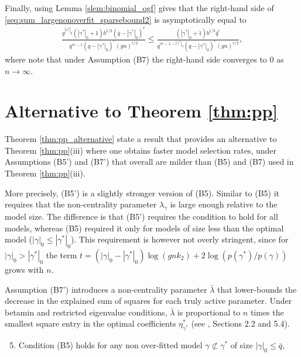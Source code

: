 Finally, using Lemma \ref{slem:binomial_ogf} gives that the right-hand side of \eqref{seq:sum_largenonoverfit_sparsebound2} is asymptotically equal to
\begin{align}
\frac{q^{|\gamma^*|_0} (|\gamma^*|_0+1) b^{1/2} (\bar{q}-|\gamma^*|_0)^r}{q^{cr-1} (q - |\gamma^*|_0)^r (g n)^{r/2}}
\leq 
\frac{(|\gamma^*|_0+1) b^{1/2} \bar{q}^r}{q^{cr-1-|\gamma^*|_0} (q - |\gamma^*|_0)^r (g n)^{r/2}},
\nonumber
\end{align}
where note that under Assumption (B7) the right-hand side converges to 0 as $n \rightarrow \infty$.






\section{Alternative to Theorem \ref{thm:pp}}
\label{ssec:alt_thm_pp}


Theorem \ref{thm:pp_alternative} state a result that provides an alternative to Theorem \ref{thm:pp}(iii) where one obtains faster model selection rates, under Assumptions (B5') and (B7') that overall are milder than (B5) and (B7) used in Theorem \ref{thm:pp}(iii).

More precisely, (B5') is a slightly stronger version of (B5). Similar to (B5) it requires that the non-centrality parameter $\lambda_\gamma$ is large enough relative to the model size. The difference is that (B5') requires the condition to hold for all models, whereas (B5) required it only for models of size less than the optimal model ($|\gamma|_0 \leq |\gamma^*|_0$). This requirement is however not overly stringent, since for $|\gamma|_0 > |\gamma^*|_0$ the term
$
 t= (|\gamma|_0 - |\gamma^*|_0) \log(g n k_2) + 2 \log \left( p(\gamma^*)/p(\gamma) \right)
$
grows with $n$.

Assumption (B7') introduces a non-centrality parameter $\bar{\lambda}$ that lower-bounds the decrease in the explained sum of squares for each truly active parameter. Under betamin and restricted eigenvalue conditions, $\bar{\lambda}$ is proportional to $n$ times the smallest square entry in the optimal coefficients $\eta_{\gamma^*}^*$ (see \cite{rossell:2022}, Sections 2.2 and 5.4).


\begin{enumerate}[leftmargin=*,label=(B\arabic*')]
\setcounter{enumi}{4}
\item Condition (B5) holds for any non over-fitted model $\gamma \not\subset \gamma^*$ of size $|\gamma|_0 \leq \bar{q}$,
\end{enumerate}


